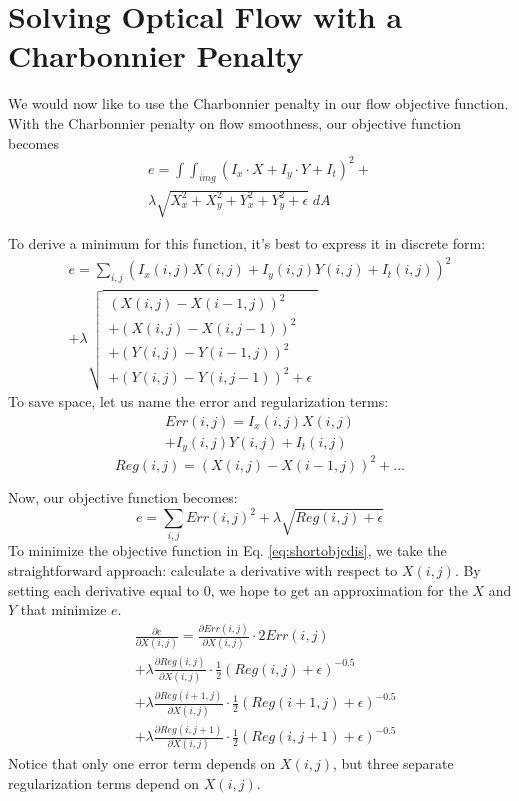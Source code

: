 \documentclass[10pt,twocolumn,letterpaper]{article}
\begin{document}
\section{Solving Optical Flow with a Charbonnier Penalty}
We would now like to use the Charbonnier penalty in our flow objective function.  With the Charbonnier penalty on flow smoothness, our objective function becomes
\begin{multline} \label{eq:objectivec}
e = \int \int_{img} (I_x \cdot X + I_y \cdot Y + I_t)^2 + \\
\lambda \sqrt{X_x^2 + X_y^2 + Y_x^2 + Y_y^2 + \epsilon} \; dA 
\end{multline}

To derive a minimum for this function, it's best to express it in discrete form:
\begin{multline} \label{eq:objectivecDiscrete}
e = \sum_{i,j} (I_x(i, j) X(i, j) + I_y(i, j) Y(i, j) + I_t(i, j))^2 \\
+ \lambda \sqrt{
\begin{array}{c}
(X(i, j) - X(i-1, j))^2 \\
+ (X(i,j) - X(i,j-1))^2 \\
+ (Y(i,j) - Y(i-1, j))^2 \\
+ (Y(i,j) - Y(i,j-1))^2 + \epsilon
\end{array}
}
\end{multline}
To save space, let us name the error and regularization terms:
\begin{multline} \label{eq:errorTerm}
Err(i, j) = I_x(i, j) X(i, j) \\
+ I_y(i, j) Y(i, j) + I_t(i, j)
\end{multline}
\begin{equation} \label{eq:regTerm}
Reg(i,j) = (X(i,j) - X(i-1,j))^2 + ...
\end{equation}

Now, our objective function becomes:
\begin{equation} \label{eq:shortobjcdis}
e = \sum_{i,j} Err(i,j)^2 + \lambda \sqrt{Reg(i,j) + \epsilon }
\end{equation}
To minimize the objective function in Eq. \ref{eq:shortobjcdis}, we take the straightforward approach: calculate a derivative with respect to $X(i, j)$.  By setting each derivative equal to $0$, we hope to get an approximation for the $X$ and $Y$ that minimize $e$.
\begin{equation}
\begin{aligned}
&\frac{\partial e}{\partial X(i, j)} = \frac{\partial Err(i,j)}{\partial X(i, j)} \cdot 2 Err(i, j) \\
&+ \lambda \frac{\partial Reg(i,j)}{\partial X(i, j)} \cdot \frac{1}{2} (Reg(i, j) + \epsilon)^{-0.5}  \\
&+ \lambda \frac{\partial Reg(i+1,j)}{\partial X(i, j)} \cdot \frac{1}{2} (Reg(i+1, j) + \epsilon)^{-0.5}  \\
&+ \lambda \frac{\partial Reg(i,j+1)}{\partial X(i, j)} \cdot \frac{1}{2} (Reg(i, j+1) + \epsilon)^{-0.5}
\end{aligned}
\label{eq:dedx}
\end{equation}
Notice that only one error term depends on $X(i, j)$, but three separate regularization terms depend on $X(i, j)$.
\end{document}
